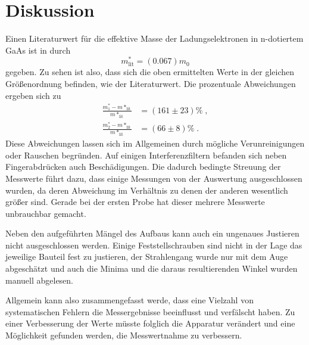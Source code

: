 \section{Diskussion}
\label{sec:Diskussion}

Einen Literaturwert für die effektive Masse der Ladungselektronen in n-dotiertem GaAs ist in \cite{effM} durch 
\begin{equation*}
    m^*_\text{lit}= (0.067) m_0
\end{equation*}
gegeben. Zu sehen ist also, dass sich die oben ermittelten Werte in der gleichen Größenordnung befinden, wie der Literaturwert.
Die prozentuale Abweichungen ergeben sich zu
\begin{align*}
    \frac{m^*_1-m*_\text{lit}}{m*_\text{lit}}&=(161\pm 23) \%\; ,\\
    \frac{m^*_2-m*_\text{lit}}{m*_\text{lit}}&=(66\pm 8) \% \; .
\end{align*}
Diese Abweichungen lassen sich im Allgemeinen durch mögliche Verunreinigungen oder Rauschen begründen. Auf einigen Interferenzfiltern befanden sich neben Fingerabdrücken auch 
Beschädigungen. Die dadurch bedingte Streuung der Messwerte führt dazu, dass einige Messungen von der Auswertung ausgeschlossen wurden, da deren Abweichung im Verhältnis zu denen der anderen wesentlich größer
sind. Gerade bei der ersten Probe hat dieser mehrere Messwerte unbrauchbar gemacht.

Neben den aufgeführten Mängel des Aufbaus kann auch ein ungenaues Justieren nicht ausgeschlossen werden. Einige Feststellschrauben sind nicht in der Lage das jeweilige Bauteil fest zu justieren, der Strahlengang wurde nur mit dem Auge 
abgeschätzt und auch die Minima und die daraus resultierenden Winkel wurden manuell abgelesen.

Allgemein kann also zusammengefasst werde, dass eine Vielzahl von systematischen Fehlern die Messergebnisse beeinflusst und verfälscht haben. Zu einer Verbesserung der Werte müsste folglich 
die Apparatur verändert und eine Möglichkeit gefunden werden, die Messwertnahme zu verbessern.